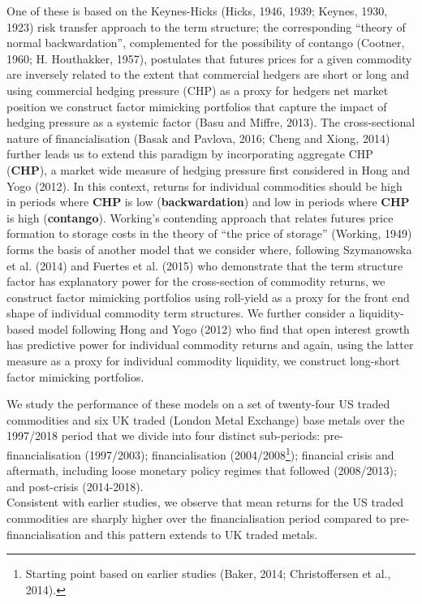 \documentclass[]{elsarticle} %
\begin{document}
One of these is based on the Keynes-Hicks (Hicks, 1946, 1939; Keynes, 1930, 1923) risk transfer approach to the term structure; the corresponding ``theory of normal backwardation'', complemented for the possibility of contango (Cootner, 1960; H. Houthakker, 1957), postulates that futures prices for a given commodity are inversely related to the extent that commercial hedgers are short or long and using commercial hedging pressure (CHP) as a proxy for hedgers net market position we construct factor mimicking portfolios that capture the impact of hedging pressure as a systemic factor (Basu and Miffre, 2013). The cross-sectional nature of financialisation (Basak and Pavlova, 2016; Cheng and Xiong, 2014) further leads us to extend this paradigm by incorporating aggregate CHP (\textbf{CHP}), a market wide measure of hedging pressure first considered in Hong and Yogo (2012). In this context, returns for individual commodities should be high in periods where \textbf{CHP} is low (\textbf{backwardation}) and low in periods where \textbf{CHP} is high (\textbf{contango}). Working's contending approach that relates futures price formation to storage costs in the theory of ``the price of storage'' (Working, 1949) forms the basis of another model that we consider where, following Szymanowska et al. (2014) and Fuertes et al. (2015) who demonstrate that the term structure factor has explanatory power for the cross-section of commodity returns, we construct factor mimicking portfolios using roll-yield as a proxy for the front end shape of individual commodity term structures. We further consider a liquidity-based model following Hong and Yogo (2012) who find that open interest growth has predictive power for individual commodity returns and again, using the latter measure as a proxy for individual commodity liquidity, we construct long-short factor mimicking portfolios.

\bigskip\bigskip\setlength{\parindent}{0pt}

We study the performance of these models on a set of twenty-four US traded commodities and six UK traded (London Metal Exchange) base metals over the 1997/2018 period that we divide into four distinct sub-periods: pre-financialisation (1997/2003); financialisation (2004/2008\footnote{Starting point based on earlier studies (Baker, 2014; Christoffersen et al., 2014).}); financial crisis and aftermath, including loose monetary policy regimes that followed (2008/2013); and post-crisis (2014-2018).\\
Consistent with earlier studies, we observe that mean returns for the US traded commodities are sharply higher over the financialisation period compared to pre-financialisation and this pattern extends to UK traded metals.
\end{document}
